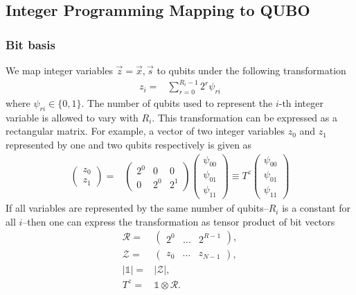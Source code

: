 \documentclass[prd,twocolumn,tightenlines,preprintnumbers,showpacs,superscriptaddress,notitlepage,nofootinbib,eqsecnum,floatfix,longbibliography,aps,10pt]{revtex4-2}
\begin{document}
\subsection{Integer Programming Mapping to QUBO}
\label{sec:methods:ilp}

\subsubsection{Bit basis}
\label{sec:methods:bit-basis}

We map integer variables $\vec z = \vec x, \vec s$ to qubits under the following transformation~\cite{Chang:2018uoc}
\begin{align}
 z_i = & \sum_{r=0}^{R_i-1} 2^r \psi_{ri}
 \label{eq:int_to_bin}
\end{align}
where $\psi_{ri} \in \{0, 1\}$.
The number of qubits used to represent the $i$-th integer variable is allowed to vary with $R_i$.
This transformation can be expressed as a rectangular matrix.
For example, a vector of two integer variables $z_0$ and $z_1$ represented by one and two qubits respectively is given as
\begin{align}
 \begin{pmatrix}
  z_0 \\
  z_1
 \end{pmatrix}
 = &
 \begin{pmatrix}
  2^0 & 0   & 0   \\
  0   & 2^0 & 2^1
 \end{pmatrix}
 \begin{pmatrix}
  \psi_{00} \\
  \psi_{01} \\
  \psi_{11}
 \end{pmatrix}
 \equiv T^z \begin{pmatrix}
  \psi_{00} \\
  \psi_{01} \\
  \psi_{11}
 \end{pmatrix}
\end{align}
If all variables are represented by the same number of qubits--$R_i$ is a constant for all $i$--then one can express the transformation as tensor product of bit vectors
\begin{align}
 \mathcal{R} =  & \begin{pmatrix} 2^0 & \dots & 2^{R-1}\end{pmatrix},    \\
 \mathcal{Z} =  & \begin{pmatrix} z_0 & \dots & z_{N-1}\end{pmatrix},    \\
 |\mathds{1}| = & |\mathcal{Z}|,                 \\
 T^z =          & \mathds{1}\otimes \mathcal{R}.
\end{align}
\end{document}
